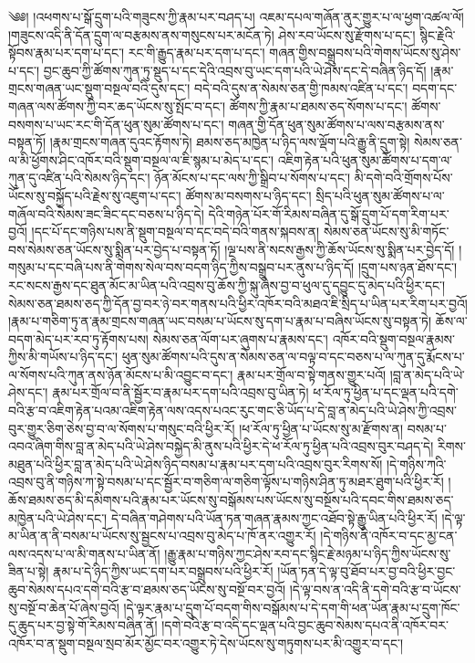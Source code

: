 \setcounter{footnote}{0} 
༄༅།  །འཕགས་པ་སྒོ་དྲུག་པའི་གཟུངས་ཀྱི་རྣམ་པར་བཤད་པ། འཇམ་དཔལ་གཞོན་ནུར་གྱུར་པ་ལ་ཕྱག་འཚལ་ལོ། །གཟུངས་འདི་ནི་དོན་དྲུག་ལ་བརྩམས་ནས་གསུངས་པར་མངོན་ཏེ། ཤེས་རབ་ཡོངས་སུ་རྫོགས་པ་དང་། སྙིང་རྗེའི་སྟོབས་རྣམ་པར་དག་པ་དང་། རང་གི་རྒྱུད་རྣམ་པར་དག་པ་དང་། གཞན་གྱིས་བསྒྲུབས་པའི་གེགས་ཡོངས་སུ་ཤེས་པ་དང་། བྱང་ཆུབ་ཀྱི་ཚོགས་ཀུན་ཏུ་སྡུད་པ་དང་དེའི་འབྲས་བུ་ཡང་དག་པའི་ཡེ་ཤེས་དང་དེ་བཞིན་ཉིད་དོ། །རྣམ་གྲངས་གཞན་ཡང་སྡུག་བསྔལ་བའི་དུས་དང་། བདེ་བའི་དུས་ན་སེམས་ཅན་གྱི་ཁམས་འཛིན་པ་དང་། བདག་དང་གཞན་ལས་ཚོགས་ཀྱི་བར་ཆད་ཡོངས་སུ་སྤོང་བ་དང་། ཚོགས་ཀྱི་རྣམ་པ་ཐམས་ཅད་སོགས་པ་དང་། ཚོགས་བསགས་པ་ཡང་རང་གི་དོན་ཕུན་སུམ་ཚོགས་པ་དང་། གཞན་གྱི་དོན་ཕུན་སུམ་ཚོགས་པ་ལས་བརྩམས་ནས་བསྟན་ཏོ། །རྣམ་གྲངས་གཞན་དུའང་རྟོགས་ཏེ། ཐམས་ཅད་མཁྱེན་པ་ཉིད་ལས་ལྡོག་པའི་རྒྱུ་ནི་དྲུག་སྟེ། སེམས་ཅན་ལ་མི་ཕྱོགས་ཤིང་འཁོར་བའི་སྡུག་བསྔལ་ལ་ཇི་སྙམ་པ་མེད་པ་དང་། འཇིག་རྟེན་པའི་ཕུན་སུམ་ཚོགས་པ་དག་ལ་ཀུན་དུ་འཛིན་པའི་སེམས་ཉིད་དང་། ཉོན་མོངས་པ་དང་ལས་ཀྱི་སྒྲིབ་པ་སོགས་པ་དང་། མི་དགེ་བའི་གྲོགས་པོས་ཡོངས་སུ་བསྐྱོད་པའི་རྗེས་སུ་འཇུག་པ་དང་། ཚོགས་མ་བསགས་པ་ཉིད་དང་། སྲིད་པའི་ཕུན་སུམ་ཚོགས་པ་ལ་གཞོལ་བའི་སེམས་ཟང་ཟིང་དང་བཅས་པ་ཉིད་དེ། དེའི་གཉེན་པོར་གོ་རིམས་བཞིན་དུ་སྒོ་དྲུག་པོ་དག་རིག་པར་བྱའོ། །དང་པོ་དང་གཉིས་པས་ནི་སྡུག་བསྔལ་བ་དང་བདེ་བའི་གནས་སྐབས་ན། སེམས་ཅན་ཡོངས་སུ་མི་གཏོང་བས་སེམས་ཅན་ཡོངས་སུ་སྨིན་པར་བྱེད་པ་བསྟན་ཏོ། །ལྔ་པས་ནི་སངས་རྒྱས་ཀྱི་ཆོས་ཡོངས་སུ་སྨིན་པར་བྱེད་དོ། །གསུམ་པ་དང་བཞི་པས་ནི་གེགས་སེལ་བས་བདག་ཉིད་ཀྱིས་བསྒྲུབ་པར་ནུས་པ་ཉིད་དོ། །དྲུག་པས་ཉན་ཐོས་དང་། རང་སངས་རྒྱས་དང་ཐུན་མོང་མ་ཡིན་པའི་འབྲས་བུ་ཆོས་ཀྱི་སྐུ་ཞེས་བྱ་བ་ཕུལ་དུ་དབྱུང་དུ་མེད་པའི་ཕྱིར་དང་། སེམས་ཅན་ཐམས་ཅད་ཀྱི་དོན་བྱ་བར་ཉེ་བར་གནས་པའི་ཕྱིར་འཁོར་བའི་མཐའ་ཇི་སྲིད་པ་ཡིན་པར་རིག་པར་བྱའོ། །རྣམ་པ་གཅིག་ཏུ་ན་རྣམ་གྲངས་གཞན་ཡང་བསམ་པ་ཡོངས་སུ་དག་པ་རྣམ་པ་བཞིས་ཡོངས་སུ་བསྟན་ཏེ། ཆོས་ལ་བདག་མེད་པར་རབ་ཏུ་རྟོགས་པས། སེམས་ཅན་ལོག་པར་ཞུགས་པ་རྣམས་དང་། འཁོར་བའི་སྡུག་བསྔལ་རྣམས་ཀྱིས་མི་གཡོས་པ་ཉིད་དང་། ཕུན་སུམ་ཚོགས་པའི་དུས་ན་སེམས་ཅན་ལ་བལྟ་བ་དང་བཅས་པ་ལ་ཀུན་དུ་རྨོངས་པ་ལ་སོགས་པའི་ཀུན་ནས་ཉོན་མོངས་པ་མི་འབྱུང་བ་དང་། རྣམ་པར་གྲོལ་བ་སྟེ་གནས་གྱུར་པའོ། །བླ་ན་མེད་པའི་ཡེ་ཤེས་དང་། རྣམ་པར་གྲོལ་བ་ནི་སྦྱོར་བ་རྣམ་པར་དག་པའི་འབྲས་བུ་ཡིན་ཏེ། ཕ་རོལ་ཏུ་ཕྱིན་པ་དང་ལྡན་པའི་དགེ་བའི་རྩ་བ་འཇིག་རྟེན་པའམ་འཇིག་རྟེན་ལས་འདས་པའང་རུང་གང་ཅི་ཡོད་པ་དེ་བླ་ན་མེད་པའི་ཡེ་ཤེས་ཀྱི་འབྲས་བུར་གྱུར་ཅིག་ཅེས་བྱ་བ་ལ་སོགས་པ་གསུང་བའི་ཕྱིར་རོ། །ཕ་རོལ་ཏུ་ཕྱིན་པ་ཡོངས་སུ་མ་རྫོགས་ན། བསམ་པ་འབའ་ཞིག་གིས་བླ་ན་མེད་པའི་ཡེ་ཤེས་བསྐྱེད་མི་ནུས་པའི་ཕྱིར་དེ་ཕ་རོལ་ཏུ་ཕྱིན་པའི་འབྲས་བུར་བཤད་དེ། རིགས་མཐུན་པའི་ཕྱིར་བླ་ན་མེད་པའི་ཡེ་ཤེས་ཉིད་བསམ་པ་རྣམ་པར་དག་པའི་འབྲས་བུར་རིགས་སོ། །དེ་གཉིས་ཀའི་འབྲས་བུ་ནི་གཉིས་ཀ་སྟེ་བསམ་པ་དང་སྦྱོར་བ་གཅིག་ལ་གཅིག་ལྟོས་པ་གཉིས་ཤིན་ཏུ་མཐར་ཐུག་པའི་ཕྱིར་རོ། །ཆོས་ཐམས་ཅད་མི་དམིགས་པའི་རྣམ་པར་ཡོངས་སུ་བསྒོམས་པས་ཡོངས་སུ་བསྔོས་པའི་དབང་གིས་ཐམས་ཅད་མཁྱེན་པའི་ཡེ་ཤེས་དང་། དེ་བཞིན་གཤེགས་པའི་ཡོན་ཏན་གཞན་རྣམས་ཀྱང་འཐོབ་སྟེ་རྒྱུ་ཡིན་པའི་ཕྱིར་རོ། །དེ་ལྟ་མ་ཡིན་ན་ནི་བསམ་པ་ཡོངས་སུ་སྦྱངས་པ་འབྲས་བུ་མེད་པ་ཁོ་ནར་འགྱུར་རོ། །དེ་གཉིས་ནི་འཁོར་བ་དང་མྱ་ངན་ལས་འདས་པ་ལ་མི་གནས་པ་ཡིན་ནོ། །རྒྱུ་རྣམ་པ་གཉིས་ཀྱང་ཤེས་རབ་དང་སྙིང་རྗེ་མཉམ་པ་ཉིད་ཀྱིས་ཡོངས་སུ་ཟིན་པ་སྟེ། རྣམ་པ་དེ་ཉིད་ཀྱིས་ཡང་དག་པར་བསྒྲུབས་པའི་ཕྱིར་རོ། །ཡོན་ཏན་དེ་ལྟ་བུ་ཐོབ་པར་བྱ་བའི་ཕྱིར་བྱང་ཆུབ་སེམས་དཔའ་དགེ་བའི་རྩ་བ་ཐམས་ཅད་ཡོངས་སུ་བསྔོ་བར་བྱའོ། །དེ་ལྟ་བས་ན་འདི་ནི་དགེ་བའི་རྩ་བ་ཡོངས་སུ་བསྔོ་བ་ཆེན་པོ་ཞེས་བྱའོ། །དེ་ལྟར་རྣམ་པ་དྲུག་པོ་བདག་གིས་བསྒོམས་པ་དེ་དག་གི་ཕན་ཡོན་རྣམ་པ་དྲུག་ཁོང་དུ་ཆུད་པར་བྱ་སྟེ་གོ་རིམས་བཞིན་ནོ། །དགེ་བའི་རྩ་བ་འདི་དང་ལྡན་པའི་བྱང་ཆུབ་སེམས་དཔའ་ནི་འཁོར་བར་འཁོར་བ་ན་སྡུག་བསྔལ་སྲབ་མོར་མྱོང་བར་འགྱུར་ཏེ་དེས་ཡོངས་སུ་གཏུགས་པར་མི་འགྱུར་བ་དང་། 